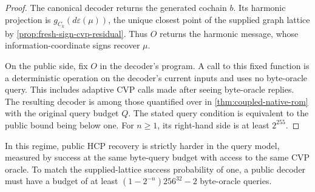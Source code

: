 \begin{proof}
The canonical decoder returns the generated cochain \(b\). Its harmonic
projection is \(g_{C_k}(d\varepsilon(\mu))\), the unique closest point of the
supplied graph lattice by \cref{prop:fresh-sign-cvp-residual}. Thus \(O\)
returns the harmonic message, whose information-coordinate signs recover
\(\mu\).

On the public side, fix \(O\) in the decoder's program. A call to this fixed
function is a deterministic operation on the decoder's current inputs and
uses no byte-oracle query. This includes adaptive CVP calls made after
seeing byte-oracle replies. The resulting decoder is among those quantified
over in \cref{thm:coupled-native-rom} with the original query budget \(Q\).
The stated query condition is equivalent to the public bound being below
one. For \(n\geq 1\), its right-hand side is at least \(2^{255}\).
\end{proof}

In this regime, public HCP recovery is strictly harder in the query model,
measured by success at the same byte-query budget with access to the same
CVP oracle. To match the supplied-lattice success probability of one, a
public decoder must have a budget of at least \((1-2^{-n})256^{32}-2\)
byte-oracle queries.
